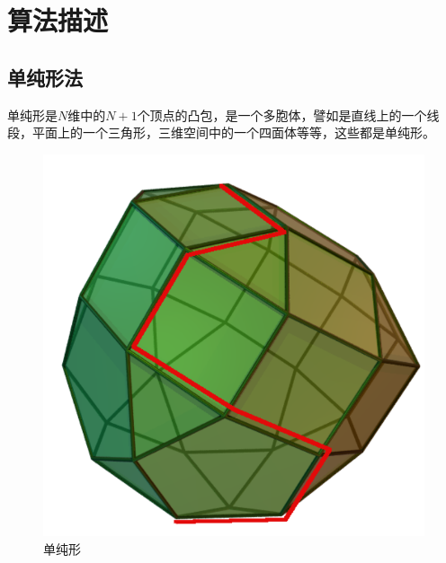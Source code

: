 \chapter{算法描述}
\section{单纯形法}
单纯形是$N$维中的$N+1$个顶点的凸包，是一个多胞体，譬如是直线上的一个线段，平面上的一个三角形，三维空间中的一个四面体等等，这些都是单纯形。

\begin{figure}[H]
	\centering
	\includegraphics[scale=0.3]{contents/img/simplex.png}
	\caption{单纯形}
\end{figure}

